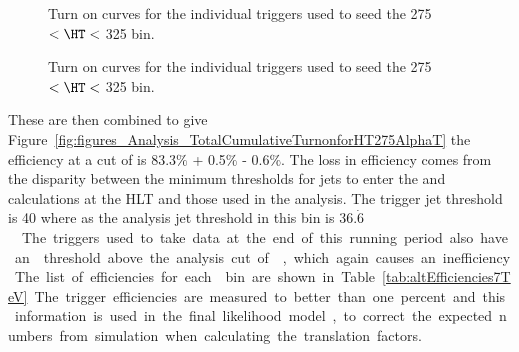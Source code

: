 \begin{figure}[ht]
  \centering
{}
  


\caption{Turn on curves for the individual \alt triggers used to seed the 
\unit{275}{\GeV} $< \HT <$ \unit{325}{\GeV} bin.}
\label{fig:HT275BinTriggers2}
\end{figure}

\begin{figure}[ht]
  \centering
{}
\caption{Turn on curves for the individual \alt triggers used to seed the 
\unit{275}{\GeV} $< \HT <$ \unit{325}{\GeV} bin.}
\label{fig:HT275BinTriggers3}
\end{figure}

These are then combined to give 
Figure~\ref{fig:figures_Analysis_TotalCumulativeTurnonforHT275AlphaT} the 
efficiency at a cut of \altg is 83.3$\%$ + 0.5$\%$ - 0.6$\%$. The loss 
in efficiency comes from the disparity between the minimum thresholds for jets 
to enter the \HT and \alt calculations at the HLT and those used in the 
analysis. The trigger jet \ET threshold is \unit{40}{\GeV} where as 
the analysis jet \ET threshold in this bin is 
\unit{36.$\dot{6}$}{\GeV}. The triggers used to take data at the end of this 
running period also have an \alt threshold above the analysis cut of \altg, which again causes an inefficiency. The list of efficiencies for each \HT 
bin are shown in Table~\ref{tab:altEfficiencies7TeV}. The trigger efficiencies 
are measured to better than one percent and this information is used in the 
final likelihood model, to correct the expected numbers from simulation when 
calculating the translation factors.



